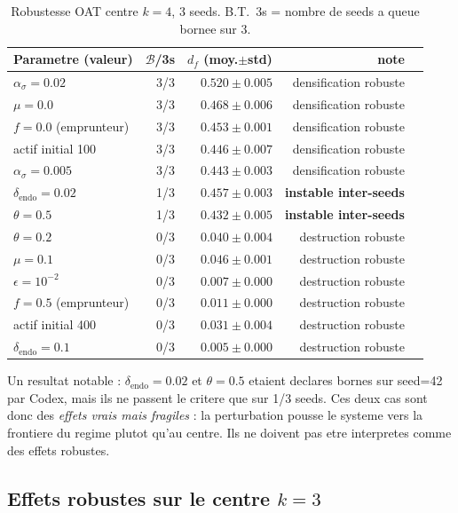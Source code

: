 \documentclass[11pt,a4paper]{article}
\begin{document}
\begin{table}[H]
\centering
\small
\begin{tabular}{lrrrr}
\toprule
Parametre (valeur) & $\mathcal{B}$/3s & $d_f$ (moy.$\pm$std) & note \\
\midrule
\(\alpha_\sigma=0.02\) & 3/3 & \(0.520\pm0.005\) & densification robuste \\
\(\mu=0.0\) & 3/3 & \(0.468\pm0.006\) & densification robuste \\
\(f=0.0\) (emprunteur) & 3/3 & \(0.453\pm0.001\) & densification robuste \\
actif initial 100 & 3/3 & \(0.446\pm0.007\) & densification robuste \\
\(\alpha_\sigma=0.005\) & 3/3 & \(0.443\pm0.003\) & densification robuste \\
\(\delta_{\mathrm{endo}}=0.02\) & 1/3 & \(0.457\pm0.003\) & \textbf{instable inter-seeds} \\
\(\theta=0.5\) & 1/3 & \(0.432\pm0.005\) & \textbf{instable inter-seeds} \\
\(\theta=0.2\) & 0/3 & \(0.040\pm0.004\) & destruction robuste \\
\(\mu=0.1\) & 0/3 & \(0.046\pm0.001\) & destruction robuste \\
\(\epsilon=10^{-2}\) & 0/3 & \(0.007\pm0.000\) & destruction robuste \\
\(f=0.5\) (emprunteur) & 0/3 & \(0.011\pm0.000\) & destruction robuste \\
actif initial 400 & 0/3 & \(0.031\pm0.004\) & destruction robuste \\
\(\delta_{\mathrm{endo}}=0.1\) & 0/3 & \(0.005\pm0.000\) & destruction robuste \\
\bottomrule
\end{tabular}
\caption{Robustesse OAT centre \(k=4\), 3 seeds. B.T.~3s = nombre de seeds a
queue bornee sur 3.}
\end{table}

Un resultat notable : \(\delta_{\mathrm{endo}}=0.02\) et \(\theta=0.5\)
etaient declares bornes sur seed=42 par Codex, mais ils ne passent le critere
que sur 1/3 seeds. Ces deux cas sont donc des \emph{effets vrais mais fragiles}
: la perturbation pousse le systeme vers la frontiere du regime plutot qu'au
centre. Ils ne doivent pas etre interpretes comme des effets robustes.

\subsection*{Effets robustes sur le centre \(k=3\)}
\end{document}
